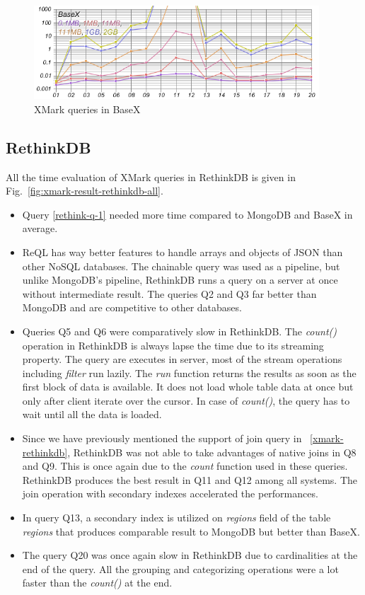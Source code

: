 \begin{figure}[hbt]
	\centering
	\includegraphics[width=0.95\textwidth]{img/result/basex/basex-all}
	\caption{XMark queries in BaseX}
	\label{fig:xmark-result-basex-all}
\end{figure}

\subsection{RethinkDB}
All the time evaluation of XMark queries in RethinkDB is given in Fig.~\ref{fig:xmark-result-rethinkdb-all}. 
\begin{itemize}
\item Query \ref{rethink-q-1} needed more time compared to MongoDB and BaseX in average. 
 \item  
  ReQL has way better features  to handle arrays and objects of JSON than other NoSQL databases. The chainable query was used as a pipeline, but unlike MongoDB's pipeline, RethinkDB runs a query on a server at once without intermediate result. The queries Q2 and Q3 far better than MongoDB and are competitive to other databases. 
 \item
 Queries Q5 and Q6 were comparatively slow in  RethinkDB. The \textit{count()} operation in RethinkDB is always lapse the time due to its streaming property. The query are executes in server, most of the stream operations including \textit{filter} run lazily. The \textit{run} function returns the results as soon as the first block of data is available. It does not load whole table data  at once but only after client iterate over the cursor. In case of \textit{count()}, the query has to wait until all the data is loaded.
 
 
 \item Since we have previously mentioned the support of join query in ~\ref{xmark-rethinkdb}, RethinkDB was not able to take advantages of native joins in Q8 and Q9. This is once again due to the \textit{count} function used in these queries. RethinkDB produces the best result in Q11 and Q12  among all systems. The join operation with secondary indexes accelerated the performances.
 
\item In query Q13,  a secondary index is utilized on \textit{regions} field of the table \textit{regions} that produces comparable result to MongoDB but better than BaseX.  

\item The query Q20 was once again slow in RethinkDB due to cardinalities at the end of the query. All the grouping and categorizing operations were a lot faster than the \textit{count()} at the end. 
\end{itemize}

